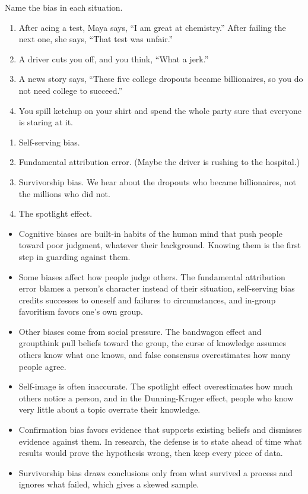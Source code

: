 \begin{Exercise}[title={Name the Bias, Again}, label=bias2]
Name the bias in each situation.
\begin{enumerate}
\item After acing a test, Maya says, ``I am great at chemistry.'' After
      failing the next one, she says, ``That test was unfair.''
\item A driver cuts you off, and you think, ``What a jerk.''
\item A news story says, ``These five college dropouts became billionaires,
      so you do not need college to succeed.''
\item You spill ketchup on your shirt and spend the whole party sure that
      everyone is staring at it.
\end{enumerate}
\end{Exercise}
\begin{Answer}[ref=bias2]
\begin{enumerate}
\item Self-serving bias.
\item Fundamental attribution error. (Maybe the driver is rushing to the
      hospital.)
\item Survivorship bias. We hear about the dropouts who became billionaires,
      not the millions who did not.
\item The spotlight effect.
\end{enumerate}
\end{Answer}

\begin{mdframed}[style=important, frametitle={Key Ideas}]
\begin{itemize}
\item Cognitive biases are built-in habits of the human mind that push people toward poor judgment, whatever their background. Knowing them is the first step in guarding against them.
\item Some biases affect how people judge others. The fundamental attribution error blames a person's character instead of their situation, self-serving bias credits successes to oneself and failures to circumstances, and in-group favoritism favors one's own group.
\item Other biases come from social pressure. The bandwagon effect and groupthink pull beliefs toward the group, the curse of knowledge assumes others know what one knows, and false consensus overestimates how many people agree.
\item Self-image is often inaccurate. The spotlight effect overestimates how much others notice a person, and in the Dunning-Kruger effect, people who know very little about a topic overrate their knowledge.
\item Confirmation bias favors evidence that supports existing beliefs and dismisses evidence against them. In research, the defense is to state ahead of time what results would prove the hypothesis wrong, then keep every piece of data.
\item Survivorship bias draws conclusions only from what survived a process and ignores what failed, which gives a skewed sample.
\end{itemize}
\end{mdframed}
